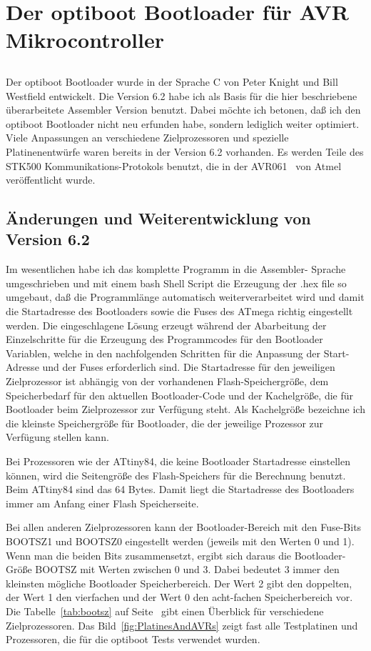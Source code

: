 \chapter{Der optiboot Bootloader für AVR Mikrocontroller}

\section*{}
Der optiboot Bootloader wurde in der Sprache C von Peter Knight und
Bill Westfield entwickelt. Die Version 6.2 habe ich als Basis
für die hier beschriebene überarbeitete Assembler Version benutzt.
Dabei möchte ich betonen, daß ich den optiboot Bootloader nicht
neu erfunden habe, sondern lediglich weiter optimiert. 
Viele Anpassungen an verschiedene Zielprozessoren und spezielle
Platinenentwürfe waren bereits in der Version 6.2 vorhanden.
Es werden Teile des STK500 Kommunikations-Protokols benutzt,
die in der AVR061~\cite{stk500} von Atmel veröffentlicht wurde.


\section{Änderungen und Weiterentwicklung von Version 6.2}
Im wesentlichen habe ich das komplette Programm in die Assembler-
Sprache umgeschrieben und mit einem bash Shell Script die Erzeugung
der .hex file so umgebaut, daß die Programmlänge
automatisch weiterverarbeitet wird und damit die Startadresse
des Bootloaders sowie die Fuses des ATmega richtig eingestellt werden.
Die eingeschlagene Lösung erzeugt während der Abarbeitung der Einzelschritte
für die Erzeugung des Programmcodes für den Bootloader Variablen,
welche in den nachfolgenden Schritten für die Anpassung
der Start-Adresse und der Fuses erforderlich sind.
Die Startadresse für den jeweiligen Zielprozessor ist abhängig von
der vorhandenen Flash-Speichergröße,
dem Speicherbedarf für den aktuellen Bootloader-Code und
der Kachelgröße, die für Bootloader beim Zielprozessor zur Verfügung steht.
Als Kachelgröße bezeichne ich die kleinste Speichergröße für Bootloader,
die der jeweilige Prozessor zur Verfügung stellen kann.


Bei Prozessoren wie der ATtiny84, die keine Bootloader Startadresse einstellen können,
wird die Seitengröße des Flash-Speichers für die Berechnung benutzt.
Beim ATtiny84 sind das 64 Bytes. Damit liegt die Startadresse des Bootloaders immer
am Anfang einer Flash Speicherseite. 

Bei allen anderen Zielprozessoren kann der Bootloader-Bereich mit den
Fuse-Bits BOOTSZ1 und BOOTSZ0 eingestellt werden (jeweils mit den Werten 0 und 1).
Wenn man die beiden Bits zusammensetzt, ergibt sich daraus die
Bootloader-Größe BOOTSZ mit Werten zwischen 0 und 3.
Dabei bedeutet 3 immer den kleinsten mögliche Bootloader Speicherbereich.
Der Wert 2 gibt den doppelten, der Wert 1 den vierfachen und
der Wert 0 den acht-fachen Speicherbereich vor.
Die Tabelle~\ref{tab:bootsz} auf Seite~\pageref{tab:bootsz} gibt einen
Überblick für verschiedene Zielprozessoren.
Das Bild~\ref{fig:PlatinesAndAVRs} zeigt fast alle Testplatinen und Prozessoren,
die für die optiboot Tests verwendet wurden. 

